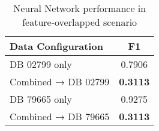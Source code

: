 \begin{table}[ht]
  \centering
  \caption{Neural Network performance in feature-overlapped scenario}
  \label{tab:neural_network_feature_overlap}
  \begin{tabular}{lc}
  \toprule
  \textbf{Data Configuration} & \textbf{F1} \\
  \midrule
  DB 02799 only & 0.7906 \\
  Combined → DB 02799 & \textbf{0.3113} \\
  \midrule
  DB 79665 only & 0.9275 \\
  Combined → DB 79665 & \textbf{0.3113} \\
  \bottomrule
  \end{tabular}
\end{table}